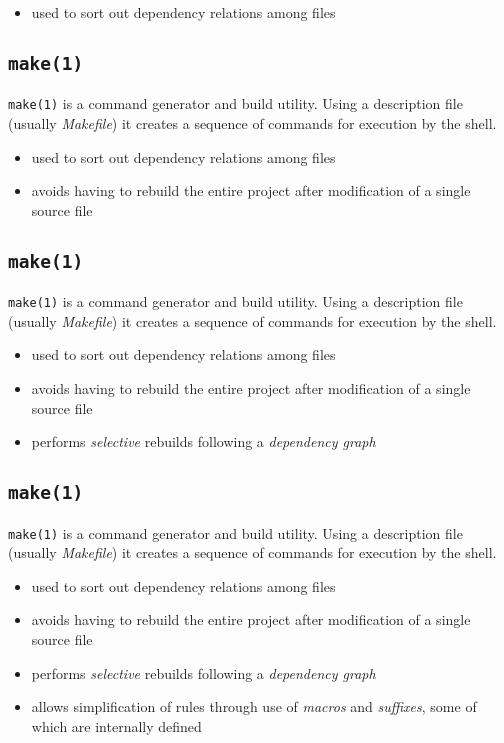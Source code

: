 \documentclass[xga]{xdvislides}
\begin{document}
\begin{itemize}
	\item used to sort out dependency relations among files
\end{itemize}

\subsection{{\tt make(1)}}
{\tt make(1)} is a command generator and build utility. Using a
description file (usually {\em Makefile}) it creates a sequence of
commands for execution by the shell.

\begin{itemize}
	\item used to sort out dependency relations among files
	\item avoids having to rebuild the entire project after modification of a
		single source file
\end{itemize}

\subsection{{\tt make(1)}}
{\tt make(1)} is a command generator and build utility. Using a
description file (usually {\em Makefile}) it creates a sequence of
commands for execution by the shell.

\begin{itemize}
	\item used to sort out dependency relations among files
	\item avoids having to rebuild the entire project after modification of a
		single source file
	\item performs {\em selective} rebuilds following a {\em dependency graph}
\end{itemize}

\subsection{{\tt make(1)}}
{\tt make(1)} is a command generator and build utility. Using a
description file (usually {\em Makefile}) it creates a sequence of
commands for execution by the shell.

\begin{itemize}
	\item used to sort out dependency relations among files
	\item avoids having to rebuild the entire project after modification of a
		single source file
	\item performs {\em selective} rebuilds following a {\em dependency graph}
	\item allows simplification of rules through use of {\em macros} and {\em
		suffixes}, some of which are internally defined
\end{itemize}
\end{document}
